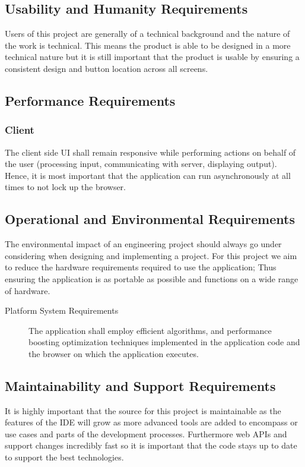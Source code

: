 \documentclass[12pt, titlepage]{article}
\begin{document}
  \subsection{Usability and Humanity Requirements}
		Users of this project are generally of a technical background and the
		nature of the work  is technical. This means the product is able to be
		designed in a more technical nature but it is still important that the product
		is usable by ensuring a consistent design and button location across all
		screens.

  \subsection{Performance Requirements}
    \subsubsection{Client}
    The client side UI shall remain responsive while performing actions on
    behalf of the user (processing input, communicating with server, displaying
    output). Hence, it is most important that the application can run
    asynchronously at all times to not lock up the browser.

  \subsection{Operational and Environmental Requirements}
	The environmental impact of an engineering project should always go under
	considering when designing and implementing a project. For this project we
	aim to reduce the hardware requirements required to use the application;
  Thus ensuring the application is as portable as possible and functions on a
  wide range of hardware.
  \begin{description}
		\item [Platform System Requirements] The application shall employ efficient
      algorithms, and performance boosting optimization techniques implemented
      in the application code and the browser on which the application
      executes.
  \end{description}

  \subsection{Maintainability and Support Requirements}
	It is highly important that the source for this project is maintainable as
	the features of the IDE will grow as more advanced tools are added to
	encompass or use cases and parts of the development processes. Furthermore
	web APIs and support changes incredibly fast so it is important that the code
	stays up to date to support the best technologies.
\end{document}
